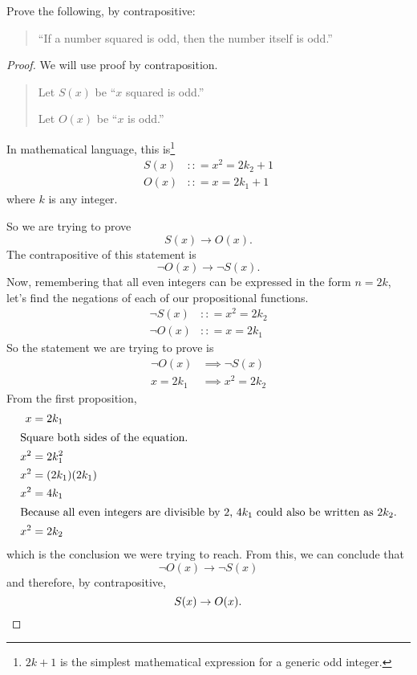 \begin{ex}
  Prove the following, by contrapositive:
  \begin{quote}
  ``If a number squared is odd, then the number itself is odd.''
  \end{quote}
  \begin{proof}
    We will use proof by contraposition.
    \begin{quote}
      Let $S(x)$ be ``$x$ squared is odd.''

      Let $O(x)$ be ``$x$ is odd.''
    \end{quote}
    In mathematical language, this is\footnote{$2k+1$ is the simplest mathematical expression for a generic odd integer.}
    \begin{align*}
      S(x) & : : = x^2 = 2k_2+1 \\
      O(x) & : : = x = 2k_1+1
    \end{align*}
    where $k$ is any integer.

    So we are trying to prove
    \[ S(x) \to O(x). \]
    The contrapositive of this statement is
    \[\neg O(x) \to \neg S(x).\]
    Now, remembering that all even integers can be expressed in the form $n=2k$, let's find the negations of each of our propositional functions.
    \begin{align*}
      \neg S(x) &: : = x^2 = 2k_2 \\
      \neg O(x) &: : = x = 2k_1
    \end{align*}
    So the statement we are trying to prove is
    \begin{align*}
      \neg O(x) &\implies \neg S(x) \\
      x = 2k_1 &\implies x^2=2k_2
    \end{align*}
    From the first proposition,
    \begin{align*}
      x &= 2k_1 \\
      \intertext{Square both sides of the equation.}
      x^2 &= 2k_1^2 \\
      x^2 &= (2k_1)(2k_1) \\
      x^2 &= 4k_1 \\
      \intertext{Because all even integers are divisible by $2$, $4k_1$ could also be written as $2k_2$.}
      x^2 &= 2k_2
    \end{align*}
    which is the conclusion we were trying to reach.
    From this, we can conclude that
    \[ \neg O(x) \to \neg S(x)\]
    and therefore, by contrapositive,
    \[ S(x)\to O(x).\qedhere\]
  \end{proof}
\end{ex}


